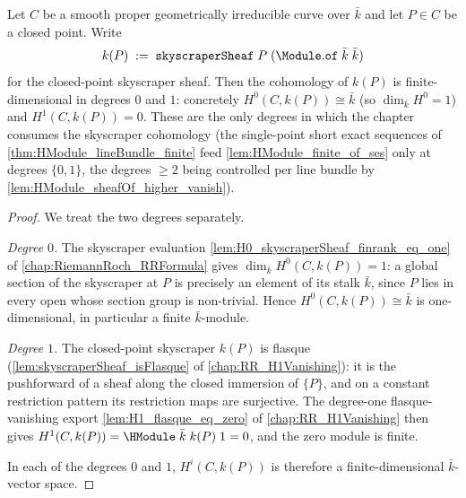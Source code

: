 \begin{lemma}

  \label{lem:HModule_skyscraper_finite}
  Let \(C\) be a smooth proper geometrically irreducible curve over
  \(\bar k\) and let \(P \in C\) be a closed point. Write
  \[
    k(P) \;:=\; \mathtt{skyscraperSheaf}\;P\;
      (\Module.\mathtt{of}\;\bar k\;\bar k)
  \]
  for the closed-point skyscraper sheaf. Then the cohomology of
  \(k(P)\) is finite-dimensional in degrees \(0\) and \(1\): concretely
  \(H^0(C, k(P)) \cong \bar k\) (so \(\dim_{\bar k} H^0 = 1\)) and
  \(H^1(C, k(P)) = 0\). These are the only degrees in which the chapter
  consumes the skyscraper cohomology (the single-point short exact
  sequences of \cref{thm:HModule_lineBundle_finite} feed
  \cref{lem:HModule_finite_of_ses} only at degrees \(\{0, 1\}\), the
  degrees \(\ge 2\) being controlled per line bundle by
  \cref{lem:HModule_sheafOf_higher_vanish}).

\end{lemma}

\begin{proof}
        \leanok
  We treat the two degrees separately.

  \emph{Degree \(0\).} The skyscraper evaluation
  \cref{lem:H0_skyscraperSheaf_finrank_eq_one} of
  \cref{chap:RiemannRoch_RRFormula} gives
  \(\dim_{\bar k} H^0(C, k(P)) = 1\): a global section of the skyscraper
  at \(P\) is precisely an element of its stalk \(\bar k\), since
  \(P\) lies in every open whose section group is non-trivial. Hence
  \(H^0(C, k(P)) \cong \bar k\) is one-dimensional, in particular a
  finite \(\bar k\)-module.

  \emph{Degree \(1\).} The closed-point skyscraper \(k(P)\) is
  flasque (\cref{lem:skyscraperSheaf_isFlasque} of
  \cref{chap:RR_H1Vanishing}): it is the pushforward of a sheaf along
  the closed immersion of \(\{P\}\), and on a constant restriction
  pattern its restriction maps are surjective. The degree-one
  flasque-vanishing export \cref{lem:H1_flasque_eq_zero} of
  \cref{chap:RR_H1Vanishing} then gives
  \(H^1(C, k(P)) = \HModule\;\bar k\;k(P)\;1 = 0\), and the zero module
  is finite.

  In each of the degrees \(0\) and \(1\), \(H^i(C, k(P))\) is therefore
  a finite-dimensional \(\bar k\)-vector space.
\end{proof}

